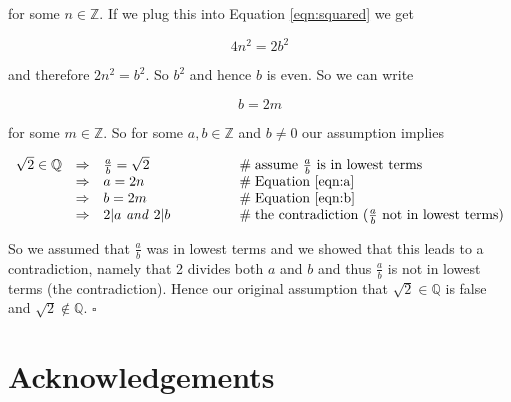 \documentclass[11pt, oneside]{article}   	%
\theoremstyle{definition}
\begin{document}
\bigskip
\noindent
for some $n \in \mathbb{Z}$. If we plug this into Equation \ref{eqn:squared} we get

\begin{equation*}
4 n^2 = 2 b^2
\end{equation*}

\bigskip
\noindent
and therefore $2n^2 = b^2$. So $b^2$ and hence $b$ is even. So we can write

\begin{equation}
 b = 2 m
 \label{eqn:b}
 \end{equation}

 \bigskip
 \noindent
 for some $m \in \mathbb{Z}$. So for some $a,b \in \mathbb{Z}$ and  $b \neq 0$ our assumption implies


\begin{equation*}
\begin{array}{llll}
\sqrt{2} \in \mathbb{Q} 
&\Rightarrow& \frac{a}{b} = \sqrt{2}                               &\qquad \qquad \mathrel{\#} \text{assume $\frac{a}{b}$ is in lowest terms} \\
&\Rightarrow& a = 2n                                                    &\qquad \qquad \mathrel{\#} \text{Equation } \ref{eqn:a} \\
&\Rightarrow& b = 2m                                                   &\qquad \qquad \mathrel{\#} \text{Equation } \ref{eqn:b} \\
&\Rightarrow& \text{$2|a$ \emph{and} $2|b$}               &\qquad \qquad \mathrel{\#} \text{the contradiction ($\frac{a}{b}$ not in lowest terms)}
\end{array}
\end{equation*}


\bigskip
\noindent
So we assumed that $\frac{a}{b}$ was in lowest terms and we showed that this leads to a contradiction,  namely that 2 divides both $a$ and $b$
and thus $\frac{a}{b}$ is not in lowest terms (the contradiction). Hence our original assumption that $\sqrt{2} \in \mathbb{Q}$ is false and
$\sqrt{2} \notin \mathbb{Q}$. $\square$

\newpage
\section{Acknowledgements}



\end{document}
